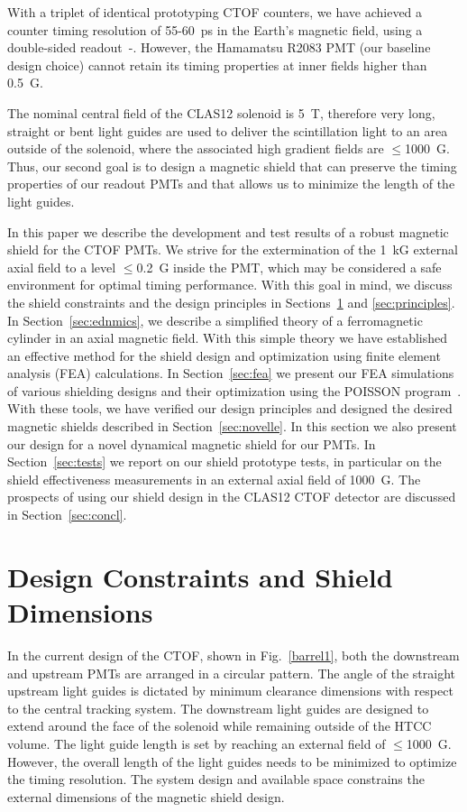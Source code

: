 \documentclass[12pt]{article}
\begin{document}
With a triplet of identical prototyping CTOF counters, we have achieved a counter 
timing resolution of 55-60~ps in the Earth's magnetic field, using a double-sided 
readout~\cite{r1}-\cite{6percent}. However, the Hamamatsu R2083 PMT (our baseline
design choice) cannot retain its timing properties at inner fields higher than 0.5~G. 

The nominal central field of the CLAS12 solenoid is 5~T, therefore very long, straight 
or bent light guides are used to deliver the scintillation light to an area outside 
of the solenoid, where the associated high gradient fields are $\le$1000~G. Thus, our 
second goal is to design a magnetic shield that can preserve the timing properties of 
our readout PMTs and that allows us to minimize the length of the light guides.
   
In this paper we describe the development and test results of a robust magnetic shield 
for the CTOF PMTs. We strive for the extermination of the 1~kG external axial field to 
a level $\le$0.2~G inside the PMT, which may be considered a safe environment for 
optimal timing performance. With this goal in mind, we discuss the shield constraints 
and the design principles in Sections~\ref{sec:constr} and \ref{sec:principles}. In 
Section~\ref{sec:ednmics}, we describe a simplified theory of a ferromagnetic cylinder 
in an axial magnetic field. With this simple theory we have established an effective 
method  for the shield design and optimization using finite element analysis (FEA) 
calculations. In Section~\ref{sec:fea} we present our FEA simulations of various 
shielding designs and their optimization using the POISSON program~\cite{poisson}. 
With these tools, we have verified our design principles and designed the desired 
magnetic shields described in Section~\ref{sec:novelle}. In this section we also 
present our design for a novel dynamical magnetic shield for our PMTs. In 
Section~\ref{sec:tests} we report on our shield prototype tests, in particular on the 
shield effectiveness measurements in an external axial field of 1000~G. The prospects 
of using our shield design in the CLAS12 CTOF detector are discussed in 
Section~\ref{sec:concl}.   

\section{Design Constraints and Shield Dimensions}
\label{sec:constr}

In the current design of the CTOF, shown in Fig.~\ref{barrel1}, both the downstream 
and upstream PMTs are arranged in a circular pattern. The angle of the straight 
upstream light guides is dictated by minimum clearance dimensions with respect to the 
central tracking system. The downstream light guides are designed to extend around the
face of the solenoid while remaining outside of the HTCC volume. The light guide
length is set by reaching an external field of $\le$1000~G. However, the overall
length of the light guides needs to be minimized to optimize the timing resolution.
The system design and available space constrains the external dimensions of the
magnetic shield design.
\end{document}
